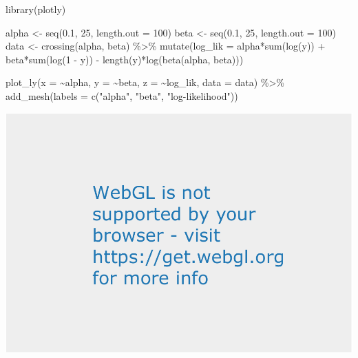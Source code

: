 \documentclass[
]{book}
\newenvironment{Shaded}{\begin{snugshade}}{\end{snugshade}}
\newcommand{\AttributeTok}[1]{\textcolor[rgb]{0.77,0.63,0.00}{#1}}
\newcommand{\DecValTok}[1]{\textcolor[rgb]{0.00,0.00,0.81}{#1}}
\newcommand{\FloatTok}[1]{\textcolor[rgb]{0.00,0.00,0.81}{#1}}
\newcommand{\FunctionTok}[1]{\textcolor[rgb]{0.00,0.00,0.00}{#1}}
\newcommand{\NormalTok}[1]{#1}
\newcommand{\OtherTok}[1]{\textcolor[rgb]{0.56,0.35,0.01}{#1}}
\newcommand{\SpecialCharTok}[1]{\textcolor[rgb]{0.00,0.00,0.00}{#1}}
\newcommand{\StringTok}[1]{\textcolor[rgb]{0.31,0.60,0.02}{#1}}
\begin{document}
\begin{Shaded}
\begin{Highlighting}[]
\FunctionTok{library}\NormalTok{(plotly)}

\NormalTok{alpha }\OtherTok{\textless{}{-}} \FunctionTok{seq}\NormalTok{(}\FloatTok{0.1}\NormalTok{, }\DecValTok{25}\NormalTok{, }\AttributeTok{length.out =} \DecValTok{100}\NormalTok{)}
\NormalTok{beta  }\OtherTok{\textless{}{-}} \FunctionTok{seq}\NormalTok{(}\FloatTok{0.1}\NormalTok{, }\DecValTok{25}\NormalTok{, }\AttributeTok{length.out =} \DecValTok{100}\NormalTok{)}
\NormalTok{data }\OtherTok{\textless{}{-}} \FunctionTok{crossing}\NormalTok{(alpha, beta) }\SpecialCharTok{\%\textgreater{}\%}
  \FunctionTok{mutate}\NormalTok{(}\AttributeTok{log\_lik =}\NormalTok{ alpha}\SpecialCharTok{*}\FunctionTok{sum}\NormalTok{(}\FunctionTok{log}\NormalTok{(y)) }\SpecialCharTok{+}\NormalTok{ beta}\SpecialCharTok{*}\FunctionTok{sum}\NormalTok{(}\FunctionTok{log}\NormalTok{(}\DecValTok{1} \SpecialCharTok{{-}}\NormalTok{ y)) }\SpecialCharTok{{-}} 
           \FunctionTok{length}\NormalTok{(y)}\SpecialCharTok{*}\FunctionTok{log}\NormalTok{(}\FunctionTok{beta}\NormalTok{(alpha, beta)))}

\FunctionTok{plot\_ly}\NormalTok{(}\AttributeTok{x =} \SpecialCharTok{\textasciitilde{}}\NormalTok{alpha, }\AttributeTok{y =} \SpecialCharTok{\textasciitilde{}}\NormalTok{beta, }\AttributeTok{z =} \SpecialCharTok{\textasciitilde{}}\NormalTok{log\_lik, }\AttributeTok{data =}\NormalTok{ data) }\SpecialCharTok{\%\textgreater{}\%}
  \FunctionTok{add\_mesh}\NormalTok{(}\AttributeTok{labels =} \FunctionTok{c}\NormalTok{(}\StringTok{"alpha"}\NormalTok{, }\StringTok{"beta"}\NormalTok{, }\StringTok{"log{-}likelihood"}\NormalTok{))}
\end{Highlighting}
\end{Shaded}

\includegraphics{01-01-maximum-likelihood_files/figure-latex/unnamed-chunk-5-1.pdf}
\end{document}
